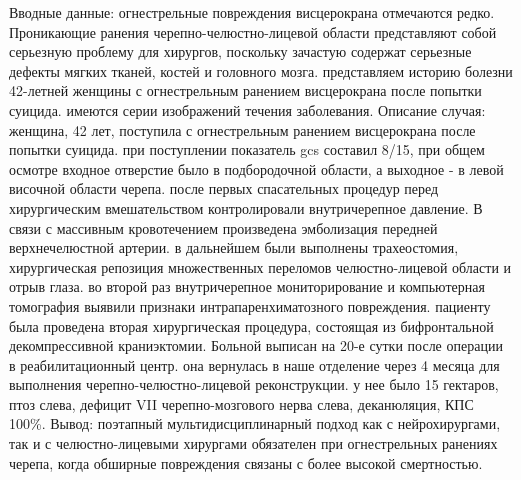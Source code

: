 Вводные данные: огнестрельные повреждения висцерокрана отмечаются редко.
Проникающие ранения черепно-челюстно-лицевой области представляют собой
серьезную проблему для хирургов, поскольку зачастую содержат серьезные дефекты
мягких тканей, костей и головного мозга. представляем историю болезни 42-летней
женщины с огнестрельным ранением висцерокрана после попытки суицида. имеются
серии изображений течения заболевания. Описание случая: женщина, 42 лет,
поступила с огнестрельным ранением висцерокрана после попытки суицида. при
поступлении показатель gcs составил 8/15, при общем осмотре входное отверстие
было в подбородочной области, а выходное - в левой височной области черепа.
после первых спасательных процедур перед хирургическим вмешательством
контролировали внутричерепное давление. В связи с массивным кровотечением
произведена эмболизация передней верхнечелюстной артерии. в дальнейшем были
выполнены трахеостомия, хирургическая репозиция множественных переломов
челюстно-лицевой области и отрыв глаза. во второй раз внутричерепное
мониторирование и компьютерная томография выявили признаки интрапаренхиматозного
повреждения. пациенту была проведена вторая хирургическая процедура, состоящая
из бифронтальной декомпрессивной краниэктомии. Больной выписан на 20-е сутки
после операции в реабилитационный центр. она вернулась в наше отделение через 4
месяца для выполнения черепно-челюстно-лицевой реконструкции. у нее было 15
гектаров, птоз слева, дефицит VII черепно-мозгового нерва слева, деканюляция,
КПС 100\%. Вывод: поэтапный мультидисциплинарный подход как с нейрохирургами, так
и с челюстно-лицевыми хирургами обязателен при огнестрельных ранениях черепа,
когда обширные повреждения связаны с более высокой смертностью.\cite{33295298}
